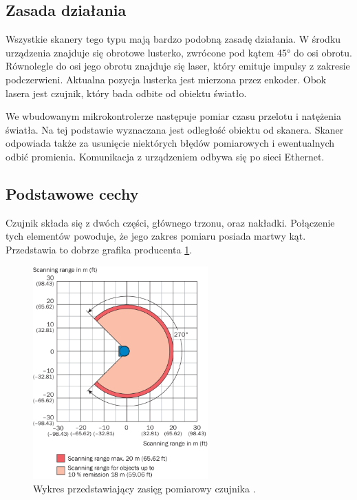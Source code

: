 	\subsection{Zasada działania}
		Wszystkie skanery tego typu mają bardzo podobną zasadę działania.
		W środku urządzenia znajduje się obrotowe lusterko, zwrócone pod kątem 45° do osi obrotu.
		Równolegle do osi jego obrotu znajduje się laser, który emituje impulsy z zakresie podczerwieni.
		Aktualna pozycja lusterka jest mierzona przez enkoder.
		Obok lasera jest czujnik, który bada odbite od obiektu światło.

		We wbudowanym mikrokontrolerze następuje pomiar czasu przelotu i natężenia światła.
		Na tej podstawie wyznaczana jest odległość obiektu od skanera.
		Skaner odpowiada także za usunięcie niektórych błędów pomiarowych i ewentualnych odbić promienia.
		Komunikacja z urządzeniem odbywa się po sieci Ethernet.

	\subsection{Podstawowe cechy}
		Czujnik składa się z dwóch części, głównego trzonu, oraz nakładki.
		Połączenie tych elementów powoduje, że jego zakres pomiaru posiada martwy kąt.
		Przedstawia to dobrze grafika producenta \ref{fig:lidar}.
		
		\begin{figure}[h]
			\centering
			\includegraphics[width=0.6\textwidth]{graphics/sick.png}
			\caption{Wykres przedstawiający zasięg pomiarowy czujnika \cite{sick_website}.}
			\label{fig:lidar}
		\end{figure} 
		
